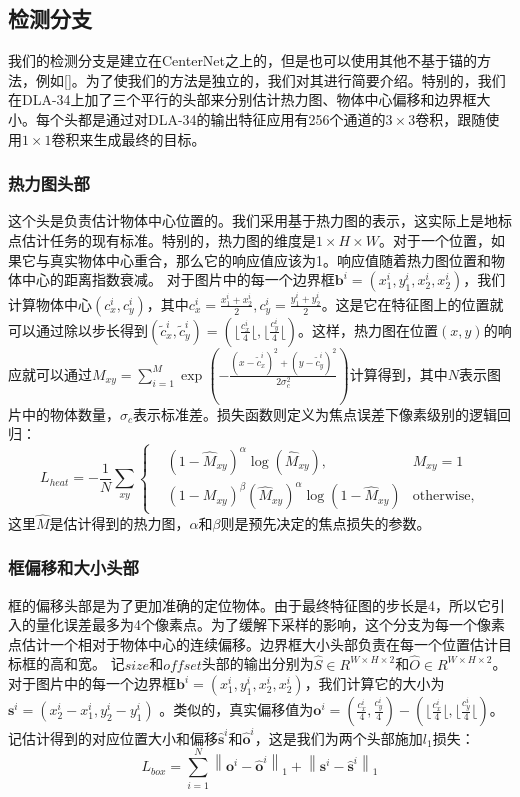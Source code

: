 \documentclass{ctexart}
\begin{document}
\subsection{检测分支}
我们的检测分支是建立在CenterNet之上的，但是也可以使用其他不基于锚的方法，例如[]。为了使我们的方法是独立的，我们对其进行简要介绍。特别的，我们在DLA-34上加了三个平行的头部来分别估计热力图、物体中心偏移和边界框大小。每个头都是通过对DLA-34的输出特征应用有256个通道的$3\times 3$卷积，跟随使用$1\times 1$卷积来生成最终的目标。
\subsubsection{热力图头部}
这个头是负责估计物体中心位置的。我们采用基于热力图的表示，这实际上是地标点估计任务的现有标准。特别的，热力图的维度是$1\times H \times W$。对于一个位置，如果它与真实物体中心重合，那么它的响应值应该为1。响应值随着热力图位置和物体中心的距离指数衰减。\newline
对于图片中的每一个边界框$\bm{b}^i = (x_1^i, y_1^i,x_2^i,x_2^i)$，我们计算物体中心$(c_x^i, c_y^i)$，其中$c_x^i=\frac{x_1^i+x_2^i}{2}, c_y^i=\frac{y_1^i+y_2^i}{2}$。这是它在特征图上的位置就可以通过除以步长得到$(\tilde{c}_x^i, \tilde{c}_y^i)=(\lfloor \frac{c_x^i}{4} \lfloor, \lfloor \frac{c_y^i}{4} \lfloor)$。这样，热力图在位置$(x, y)$的响应就可以通过$M_{xy}=\sum_{i=1}^M\exp(-\frac{(x-\tilde{c}_x^i)^2+(y-\tilde{c}_y^i)^2}{2\sigma_c^2})$计算得到，其中$N$表示图片中的物体数量，$\sigma_c$表示标准差。损失函数则定义为焦点误差下像素级别的逻辑回归：
\begin{equation}
    L_{heat}=-\frac{1}{N}\sum_{xy}\left\{
    \begin{aligned}
         & (1-\hat{M}_{xy})^\alpha\log(\hat{M}_{xy}),                 & M_{xy}=1          \\
         & (1-M_{xy})^\beta (\hat{M}_{xy})^\alpha\log(1-\hat{M}_{xy}) & \text{otherwise},
    \end{aligned}\right.
\end{equation}
这里$\hat{M}$是估计得到的热力图，$\alpha$和$\beta$则是预先决定的焦点损失的参数。
\subsubsection{框偏移和大小头部}
框的偏移头部是为了更加准确的定位物体。由于最终特征图的步长是4，所以它引入的量化误差最多为4个像素点。为了缓解下采样的影响，这个分支为每一个像素点估计一个相对于物体中心的连续偏移。边界框大小头部负责在每一个位置估计目标框的高和宽。\newline
记$size$和$offset$头部的输出分别为$\hat{S}\in R^{W\times H\times 2}$和$\hat{O}\in R^{W\times H\times 2}$。对于图片中的每一个边界框$\bm{b}^i = (x_1^i, y_1^i,x_2^i,x_2^i)$，我们计算它的大小为$\bm{s}^i=(x_2^i-x_1^i, y_2^i-y_1^i)$ 。类似的，真实偏移值为$\bm{o}^i=(\frac{c_x^i}{4}, \frac{c_y^i}{4})-(\lfloor \frac{c_x^i}{4} \lfloor, \lfloor \frac{c_y^i}{4} \lfloor)$。记估计得到的对应位置大小和偏移$\bm{\hat{s}}^i$和$\bm{\hat{o}}^i$，这是我们为两个头部施加$l_1$损失：
\begin{equation}
    L_{box}=\sum_{i=1}^N \left\| \bm{o}^i - \bm{\hat{o}}^i \right\|_1 + \left\| \bm{s}^i - \bm{\hat{s}}^i \right\|_1
\end{equation}
\end{document}
